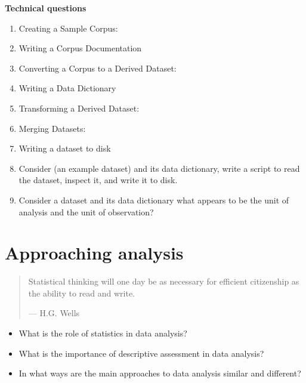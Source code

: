 \documentclass[
  letterpaper,
]{latex/krantz}
\providecommand{\tightlist}{%
  \setlength{\itemsep}{0pt}\setlength{\parskip}{0pt}}\usepackage{longtable,booktabs,array}
\begin{document}
\begin{tcolorbox}[enhanced jigsaw, left=2mm, arc=.35mm, colback=white, rightrule=.15mm, toprule=.15mm, breakable, leftrule=.75mm, opacityback=0, bottomrule=.15mm]

\textbf{Technical questions}

\begin{enumerate}
\def\labelenumi{\arabic{enumi}.}
\tightlist
\item
  Creating a Sample Corpus:
\item
  Writing a Corpus Documentation
\item
  Converting a Corpus to a Derived Dataset:
\item
  Writing a Data Dictionary
\item
  Transforming a Derived Dataset:
\item
  Merging Datasets:
\item
  Writing a dataset to disk
\item
  Consider (an example dataset) and its data dictionary, write a script
  to read the dataset, inspect it, and write it to disk.
\item
  Consider a dataset and its data dictionary what appears to be the unit
  of analysis and the unit of observation?
\end{enumerate}

\end{tcolorbox}

\hypertarget{sec-approaching-analysis}{%
\chapter{Approaching analysis}\label{sec-approaching-analysis}}

\begin{quote}
Statistical thinking will one day be as necessary for efficient
citizenship as the ability to read and write.

--- H.G. Wells
\end{quote}

\begin{tcolorbox}[enhanced jigsaw, colbacktitle=quarto-callout-note-color!10!white, arc=.35mm, toprule=.15mm, breakable, colframe=quarto-callout-note-color-frame, bottomrule=.15mm, opacitybacktitle=0.6, coltitle=black, titlerule=0mm, colback=white, toptitle=1mm, bottomtitle=1mm, title=\textcolor{quarto-callout-note-color}{\faInfo}\hspace{0.5em}{Keys}, rightrule=.15mm, leftrule=.75mm, opacityback=0, left=2mm]

\begin{itemize}
\tightlist
\item
  What is the role of statistics in data analysis?
\item
  What is the importance of descriptive assessment in data analysis?
\item
  In what ways are the main approaches to data analysis similar and
  different?
\end{itemize}

\end{tcolorbox}
\end{document}
